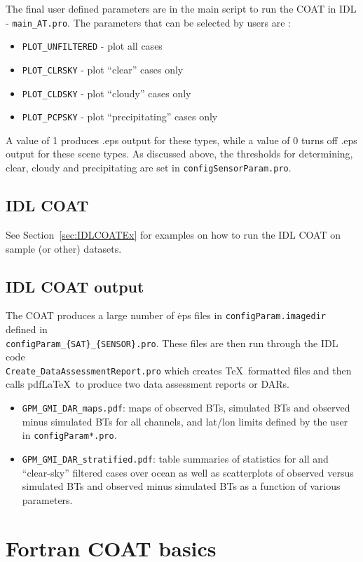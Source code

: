 \documentclass[10pt]{report}
\begin{document}
The final user defined parameters are in the main script to run the COAT in IDL - {\tt main\_AT.pro}.  
The parameters that can be selected by users are : 
\begin{itemize}
  \item {\tt PLOT\_UNFILTERED} - plot all cases
  \item {\tt PLOT\_CLRSKY} - plot ``clear'' cases only
  \item {\tt PLOT\_CLDSKY} - plot ``cloudy'' cases only
  \item {\tt PLOT\_PCPSKY} - plot ``precipitating'' cases only
\end{itemize}
A value of 1 produces .eps output for these types, while a value of 0 turns off .eps output for these scene types.  As discussed above, the thresholds for determining, clear, cloudy and precipitating are set in {\tt configSensorParam.pro}.

\section{IDL COAT}
See Section~\ref{sec:IDLCOATEx} for examples on how to run the IDL COAT on sample (or other) datasets.

\section{IDL COAT output}
The COAT produces a large number of \.eps files in {\tt configParam.imagedir} defined in\\ 
{\tt configParam\_\{SAT\}\_\{SENSOR\}.pro}. 
These files are then run through the IDL code \\ {\tt Create\_DataAssessmentReport.pro}
which creates \TeX~formatted files and then calls pdf\LaTeX~to produce 
two data assessment reports or DARs.  
\begin{itemize}
  \item {\tt GPM\_GMI\_DAR\_maps.pdf}: maps of observed BTs, simulated BTs and observed minus simulated BTs 
    for all channels, and lat/lon limits defined by the user in {\tt configParam*.pro}.
  \item {\tt GPM\_GMI\_DAR\_stratified.pdf}: table summaries of statistics for all and ``clear-sky'' filtered cases over 
    ocean as well as scatterplots of observed versus simulated BTs and observed minus simulated BTs as a function of 
    various parameters.
\end{itemize}

\chapter{Fortran COAT basics}
\end{document}
